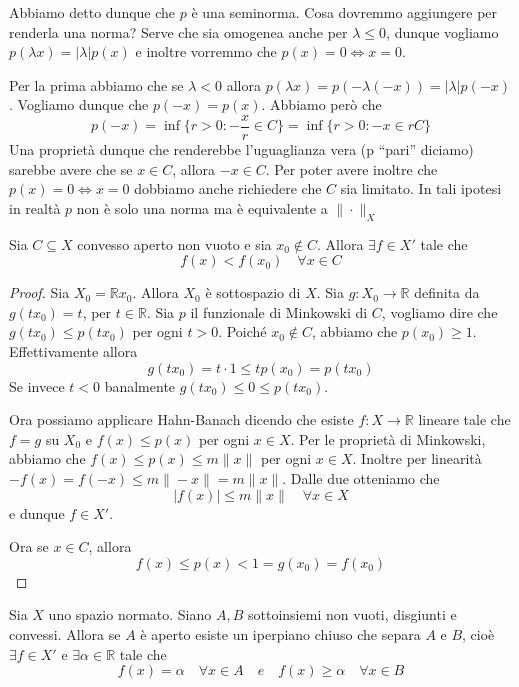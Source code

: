 \begin{remark}{}
    Abbiamo detto dunque che \(p\) è una seminorma. Cosa dovremmo aggiungere per
    renderla una norma? Serve che sia omogenea anche per \(\lambda \le 0\),
    dunque vogliamo \(p {( \lambda x)} = |\lambda| p {(x)}\) e inoltre vorremmo
    che \(p {(x)} = 0 \iff x =0\).

    Per la prima abbiamo che se \(\lambda < 0\) allora \(p {(\lambda x)} = p {( -\lambda {(-x)})} = |\lambda| p {(-x)}\). Vogliamo dunque che \(p {(-x)} = p {(x)}\). Abbiamo però che
    \[
      p {(-x )} = \inf \{r > 0 : -\frac{x}{r} \in C\} = \inf \{ r > 0 : -x \in rC\} 
    \]
    Una proprietà dunque che renderebbe l'uguaglianza vera (p ``pari'' diciamo)
    sarebbe avere che se \(x \in C\), allora \(-x \in C\). Per poter avere
    inoltre che \(p {(x)} = 0 \iff x = 0\) dobbiamo anche richiedere che \(C\)
    sia limitato. In tali ipotesi in realtà \(p\) non è solo una norma ma è
    equivalente a \(\|\cdot \|_X\) 
\end{remark}


\begin{lemma}
    Sia \(C \subseteq X \) convesso aperto non vuoto e sia \(x_{0} \not\in C\).
    Allora \(\exists f \in X'\) tale che 
    \[
      f{(x)} < f{(x_{0})} \quad \forall x \in C
    \]
\end{lemma}
\begin{proof}{}
Sia \(X_{0} = \mathbb{R}x_{0}\). Allora \(X_{0}\) è sottospazio di \(X\). Sia
\(g : X_{0} \to \mathbb{R}\) definita da \(g{(tx_{0})} = t\), per \(t \in
\mathbb{R}\). Sia \(p\) il funzionale di Minkowski di \(C\), vogliamo dire che
\(g{(tx_{0})} \le p {(tx_{0})}\) per ogni \(t > 0\). Poiché \(x_{0} \not\in C\),
abbiamo che \(p {(x_{0})} \ge 1\). Effettivamente allora
\[
  g {(tx_{0})} = t \cdot  1 \le t p {(x_{0})} = p {(t x_{0})}
\]
Se invece \(t < 0\) banalmente \(g {(tx_{0})} \le  0 \le  p {(t x_{0})}\).

Ora possiamo applicare Hahn-Banach dicendo che esiste \(f : X \to \mathbb{R}\)
lineare tale che \(f = g\) su \(X_{0}\) e \(f{(x)} \le  p {(x)}\) per ogni \(x
\in X\). Per le proprietà di Minkowski, abbiamo che \(f {(x)} \le  p {(x)} \le  m \|x\|\) per ogni \(x \in X\). Inoltre per linearità \(-f{(x)} = f{(-x)} \le m \|-x\| = m \|x\|\). Dalle due otteniamo che
\[|f{(x)}| \le m \|x\| \quad \forall x \in X\] 
e dunque \(f \in X'\).

Ora se \(x \in C\), allora
\[
  f{(x)} \le p {(x)} < 1 = g{(x_{0})} = f{(x_{0})}
\]
\end{proof}
\begin{theorem}
    Sia \(X\) uno spazio normato. Siano \(A, B\) sottoinsiemi non vuoti,
    disgiunti e convessi. Allora se \(A\) è aperto esiste un iperpiano chiuso
    che separa \(A\) e \(B\), cioè \(\exists f \in X'\) e \(\exists \alpha \in \mathbb{R}\) tale che 
    \[
      f{(x)} = \alpha \quad \forall x \in A \quad e \quad f{(x)}\ge \alpha \quad
      \forall x \in B
    \]
\end{theorem}

